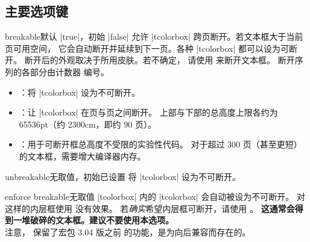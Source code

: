\clearpage
\subsection{主要选项键}
\begin{docTcbKey}[][doc updated=2017-02-01]{breakable}{}{默认 |true|，初始 |false|}
  允许 |tcolorbox| 跨页断开。若文本框大于当前页可用空间，
  它会自动断开并延续到下一页。各种 |tcolorbox| 都可以设为可断开。
  断开后的外观取决于所用皮肤。若不确定，
  请使用  来断开文本框。
  断开序列的各部分由计数器  编号。
  \begin{itemize}
  \item{}：将 |tcolorbox| 设为不可断开。
  \item{}：让 |tcolorbox| 在页与页之间断开。
    上部与下部的总高度上限各约为 65536pt（约 2300cm，即约 90 页）。
  \item{}：用于可断开框总高度不受限的实验性代码。
    对于超过 300 页（甚至更短）的文本框，需要增大编译器内存。
  \end{itemize}

\begin{dispListing}

\begin{tcolorbox}[breakable,title=My breakable box]
\lipsum[1-6]
\end{tcolorbox}
\end{dispListing}
\end{docTcbKey}
{\tcbusetemp}


\begin{docTcbKey}{unbreakable}{}{无取值，初始已设置}
  将 |tcolorbox| 设为不可断开。
\end{docTcbKey}


\begin{docTcbKey}{enforce breakable}{}{无取值}
  |tcolorbox| 内的 |tcolorbox| 会自动被设为不可断开。
  对这样的内层框使用  没有效果。
  若\emph{确实}希望内层框可断开，请使用 。
  \textbf{这通常会得到一堆破碎的文本框。建议不要使用本选项。}\\
  注意， 保留了宏包 3.04 版之前
   的功能，是为向后兼容而存在的。
\end{docTcbKey}


